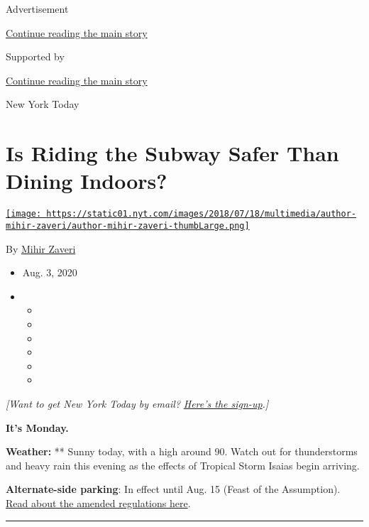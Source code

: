 Advertisement

\protect\hyperlink{after-top}{Continue reading the main story}

Supported by

\protect\hyperlink{after-sponsor}{Continue reading the main story}

New York Today

\hypertarget{is-riding-the-subway-safer-than-dining-indoors}{%
\section{Is Riding the Subway Safer Than Dining
Indoors?}\label{is-riding-the-subway-safer-than-dining-indoors}}

\href{https://www.nytimes.com/by/mihir-zaveri}{\texttt{[image: https://static01.nyt.com/images/2018/07/18/multimedia/author-mihir-zaveri/author-mihir-zaveri-thumbLarge.png]}}

By \href{https://www.nytimes.com/by/mihir-zaveri}{Mihir Zaveri}

\begin{itemize}
\item
  Aug. 3, 2020
\item
  \begin{itemize}
  \item
  \item
  \item
  \item
  \item
  \item
  \end{itemize}
\end{itemize}

\emph{{[}Want to get New York Today by email?}
\href{https://www.nytimes.com/newsletters/newyorktoday}{\emph{Here's the
sign-up}}\emph{.{]}}

\textbf{It's Monday.}

\textbf{Weather:} ** Sunny today, with a high around 90. Watch out for
thunderstorms and heavy rain this evening as the effects of Tropical
Storm Isaias begin arriving.

\textbf{Alternate-side parking}: In effect until Aug. 15 (Feast of the
Assumption).
\href{https://www1.nyc.gov/html/dot/html/motorist/alternate-side-parking.shtml\#reform}{Read
about the amended regulations here}.

\begin{center}\rule{0.5\linewidth}{\linethickness}\end{center}

